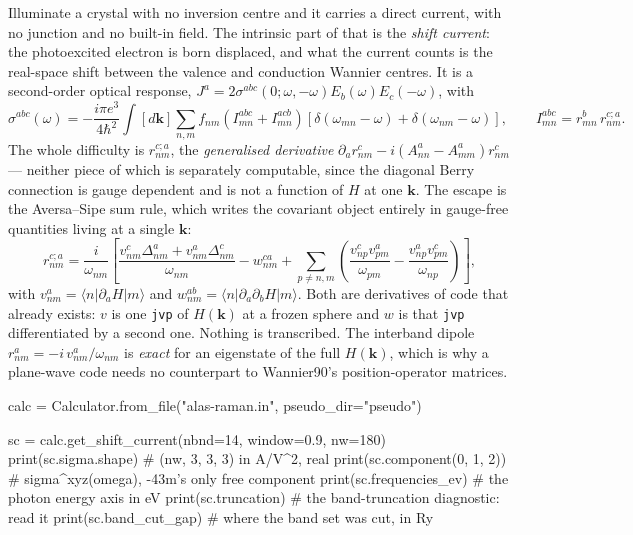 \documentclass[11pt,a4paper]{article}
\newcommand{\code}[1]{\texttt{\small #1}}
\begin{document}
Illuminate a crystal with no inversion centre and it carries a direct current,
with no junction and no built-in field. The intrinsic part of that is the
\emph{shift current}: the photoexcited electron is born displaced, and what the
current counts is the real-space shift between the valence and conduction
Wannier centres. It is a second-order optical response,
$J^a = 2\sigma^{abc}(0;\omega,-\omega)E_b(\omega)E_c(-\omega)$, with
\begin{equation*}
\sigma^{abc}(\omega) = -\frac{i\pi e^3}{4\hbar^2}\int\![d\mathbf k]
  \sum_{n,m} f_{nm}\left(I^{abc}_{mn}+I^{acb}_{mn}\right)
  \left[\delta(\omega_{mn}-\omega)+\delta(\omega_{nm}-\omega)\right],
  \qquad I^{abc}_{mn} = r^b_{mn}\,r^{c;a}_{nm} .
\end{equation*}
The whole difficulty is $r^{c;a}_{nm}$, the \emph{generalised derivative}
$\partial_a r^c_{nm} - i(A^a_{nn}-A^a_{mm})r^c_{nm}$ --- neither piece of which
is separately computable, since the diagonal Berry connection is gauge dependent
and is not a function of $H$ at one $\mathbf k$. The escape is the Aversa--Sipe
sum rule, which writes the covariant object entirely in gauge-free quantities
living at a single $\mathbf k$:
\begin{equation*}
r^{c;a}_{nm} = \frac{i}{\omega_{nm}}\left[
  \frac{v^c_{nm}\Delta^a_{nm} + v^a_{nm}\Delta^c_{nm}}{\omega_{nm}}
  - w^{ca}_{nm}
  + \sum_{p\neq n,m}\left(\frac{v^c_{np}v^a_{pm}}{\omega_{pm}}
                        - \frac{v^a_{np}v^c_{pm}}{\omega_{np}}\right)\right],
\end{equation*}
with $v^a_{nm} = \langle n|\partial_a H|m\rangle$ and
$w^{ab}_{nm} = \langle n|\partial_a\partial_b H|m\rangle$. Both are derivatives
of code that already exists: $v$ is one \code{jvp} of $H(\mathbf k)$ at a frozen
sphere and $w$ is that \code{jvp} differentiated by a second one. Nothing is
transcribed. The interband dipole $r^a_{nm} = -i\,v^a_{nm}/\omega_{nm}$ is
\emph{exact} for an eigenstate of the full $H(\mathbf k)$, which is why a
plane-wave code needs no counterpart to Wannier90's position-operator matrices.

\begin{pycode}
calc = Calculator.from_file("alas-raman.in", pseudo_dir="pseudo")

sc = calc.get_shift_current(nbnd=14, window=0.9, nw=180)
print(sc.sigma.shape)            # (nw, 3, 3, 3) in A/V^2, real
print(sc.component(0, 1, 2))     # sigma^xyz(omega), -43m's only free component
print(sc.frequencies_ev)         # the photon energy axis in eV
print(sc.truncation)             # the band-truncation diagnostic: read it
print(sc.band_cut_gap)           # where the band set was cut, in Ry
\end{pycode}
\end{document}
